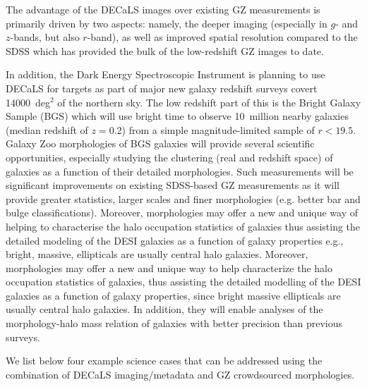 \documentclass[iop,apj,tighten]{emulateapj}
\begin{document}
The advantage of the DECaLS images over existing GZ measurements is primarily driven by two aspects: namely, the deeper imaging (especially in $g$- and $z$-bands, but also $r$-band), as well as improved spatial resolution compared to the SDSS which has provided the bulk of the low-redshift GZ images to date.

In addition, the Dark Energy Spectroscopic Instrument \citep[DESI;][]{lev13a} is planning to use DECaLS for targets as part of major new galaxy redshift surveys covert 14000~deg$^2$ of the northern sky. The low redshift part of this is the Bright Galaxy Sample (BGS) which will use bright time to observe 10~million nearby galaxies (median redshift of $z=0.2$) from a simple magnitude-limited sample of $r<19.5$. Galaxy Zoo morphologies of BGS galaxies will provide several scientific opportunities, especially studying the clustering (real and redshift space) of galaxies as a function of their detailed morphologies. Such measurements will be significant improvements on existing SDSS-based GZ measurements \citep[see ][]{ski09,ski12} as it will provide greater statistics, larger scales and finer morphologies (e.g. better bar and bulge classifications). Moreover, morphologies may offer a new and unique way of helping to characterise the halo occupation statistics of galaxies thus assisting the detailed modeling of the DESI galaxies as a function of galaxy properties e.g., bright, massive, ellipticals are usually central halo galaxies. Moreover, morphologies may offer a new and unique way to help characterize the halo occupation statistics of galaxies, thus assisting the detailed modelling of the DESI galaxies as a function of galaxy properties, since bright massive ellipticals are usually central halo galaxies. In addition, they will enable analyses of the morphology-halo mass relation of galaxies with better precision than previous surveys.

We list below four example science cases that can be addressed using the combination of DECaLS imaging/metadata and GZ crowdsourced morphologies.
\end{document}
